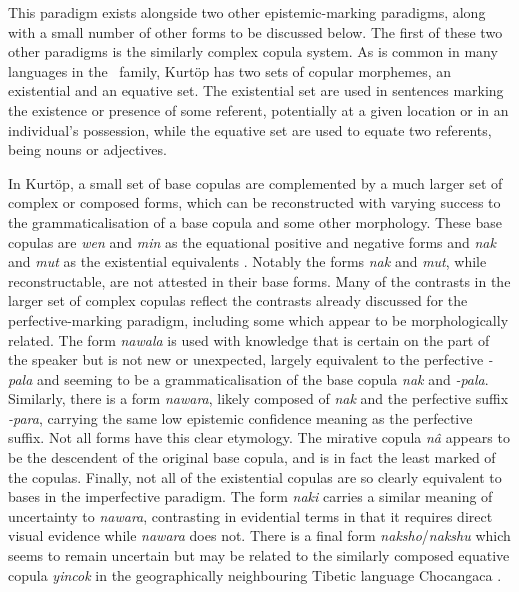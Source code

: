 This paradigm exists alongside two other epistemic-marking paradigms, along with a small number of other forms to be discussed below. The first of these two other paradigms is the similarly complex copula system. As is common in many languages in the \lfam\ family, Kurtöp has two sets of copular morphemes, an existential and an equative set. The existential set are used in sentences marking the existence or presence of some referent, potentially at a given location or in an individual's possession, while the equative set are used to equate two referents, being nouns or adjectives.

In Kurtöp, a small set of base copulas are complemented by a much larger set of complex or composed forms, which can be reconstructed with varying success to the grammaticalisation of a base copula and some other morphology. These base copulas are \textit{wen} and \textit{min} as the equational positive and negative forms and \textit{nak} and \textit{mut} as the existential equivalents \cite[120]{Hyslop2014}. Notably the forms \textit{nak} and \textit{mut}, while reconstructable, are not attested in their base forms. Many of the contrasts in the larger set of complex copulas reflect the contrasts already discussed for the perfective-marking paradigm, including some which appear to be morphologically related. The form \textit{nawala} is used with knowledge that is certain on the part of the speaker but is not new or unexpected, largely equivalent to the perfective \textit{-pala} and seeming to be a grammaticalisation of the base copula \textit{nak} and \textit{-pala}. Similarly, there is a form \textit{nawara}, likely composed of \textit{nak} and the perfective suffix \textit{-para}, carrying the same low epistemic confidence meaning as the perfective suffix. Not all forms have this clear etymology. The mirative copula \textit{nâ} appears to be the descendent of the original base copula, and is in fact the least marked of the copulas. Finally, not all of the existential copulas are so clearly equivalent to bases in the imperfective paradigm. The form \textit{naki} carries a similar meaning of uncertainty to \textit{nawara}, contrasting in evidential terms in that it requires direct visual evidence while \textit{nawara} does not. There is a final form \textit{naksho}/\textit{nakshu} which seems to remain uncertain \cites[122]{Hyslop2014}[311]{Hyslop2017} but may be related to the similarly composed equative copula \textit{yincok} in the geographically neighbouring Tibetic language Chocangaca \cite{Bodnaruk2023a}.

